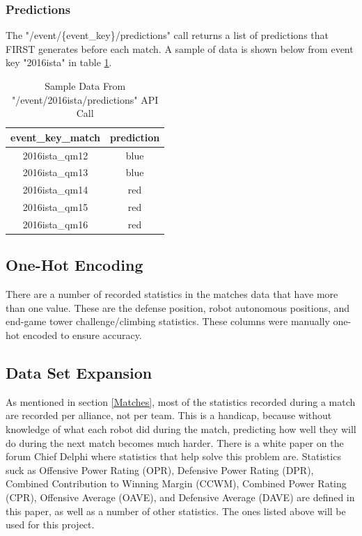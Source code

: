 \documentclass{article}
\begin{document}
\subsubsection{Predictions} \label{Predictions}
\par
The "/event/\{event\_key\}/predictions" call returns a list of predictions that FIRST generates before each match. A sample of data is shown below from event key "2016ista" in table \ref{table:4}.

\begin{table}[H]
\caption{Sample Data From "/event/2016ista/predictions" API Call}
\centering
\begin{tabular} { |c|c| }
\hline
event\_key\_match & prediction \\
\hline
2016ista\_qm12 & blue \\
\hline
2016ista\_qm13 & blue \\
\hline
2016ista\_qm14 & red \\
\hline
2016ista\_qm15 & red \\
\hline
2016ista\_qm16 & red \\
\hline
\end{tabular}
\label{table:4}
\end{table}

\subsection{One-Hot Encoding}
\par
There are a number of recorded statistics in the matches data that have more than one value. These are the defense position, robot autonomous positions, and end-game tower challenge/climbing statistics. These columns were manually one-hot encoded to ensure accuracy.

\subsection{Data Set Expansion}
\par
As mentioned in section \ref{Matches}, most of the statistics recorded during a match are recorded per alliance, not per team. This is a handicap, because without knowledge of what each robot did during the match, predicting how well they will do during the next match becomes much harder. There is a white paper \citep{statspaper} on the forum Chief Delphi where statistics that help solve this problem are. Statistics suck as Offensive Power Rating (OPR), Defensive Power Rating (DPR), Combined Contribution to Winning Margin (CCWM), Combined Power Rating (CPR), Offensive Average (OAVE), and Defensive Average (DAVE) are defined in this paper, as well as a number of other statistics. The ones listed above will be used for this project.
\end{document}
